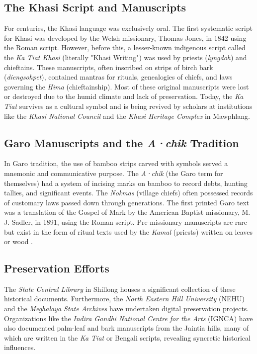 \documentclass[12pt]{article}
\begin{document}
\subsection{The Khasi Script and Manuscripts}
For centuries, the Khasi language was exclusively oral. The first systematic script for Khasi was developed by the Welsh missionary, Thomas Jones, in 1842 using the Roman script. However, before this, a lesser-known indigenous script called the \textit{Ka Tiat Khasi} (literally "Khasi Writing") was used by priests (\textit{lyngdoh}) and chieftains. These manuscripts, often inscribed on strips of birch bark (\textit{diengsohpet}), contained mantras for rituals, genealogies of chiefs, and laws governing the \textit{Hima} (chieftainship). Most of these original manuscripts were lost or destroyed due to the humid climate and lack of preservation. Today, the \textit{Ka Tiat} survives as a cultural symbol and is being revived by scholars at institutions like the \textit{Khasi National Council} and the \textit{Khasi Heritage Complex} in Mawphlang.

\subsection{Garo Manuscripts and the \textit{A·chik} Tradition}
In Garo tradition, the use of bamboo strips carved with symbols served a mnemonic and communicative purpose. The \textit{A·chik} (the Garo term for themselves) had a system of incising marks on bamboo to record debts, hunting tallies, and significant events. The \textit{Nokmas} (village chiefs) often possessed records of customary laws passed down through generations. The first printed Garo text was a translation of the Gospel of Mark by the American Baptist missionary, M. J. Sadler, in 1891, using the Roman script. Pre-missionary manuscripts are rare but exist in the form of ritual texts used by the \textit{Kamal} (priests) written on leaves or wood \citep{Momin2009}.

\subsection{Preservation Efforts}
The \textit{State Central Library} in Shillong houses a significant collection of these historical documents. Furthermore, the \textit{North Eastern Hill University} (NEHU) and the \textit{Meghalaya State Archives} have undertaken digital preservation projects. Organizations like the \textit{Indira Gandhi National Centre for the Arts} (IGNCA) have also documented palm-leaf and bark manuscripts from the Jaintia hills, many of which are written in the \textit{Ka Tiat} or Bengali scripts, revealing syncretic historical influences.
\end{document}
